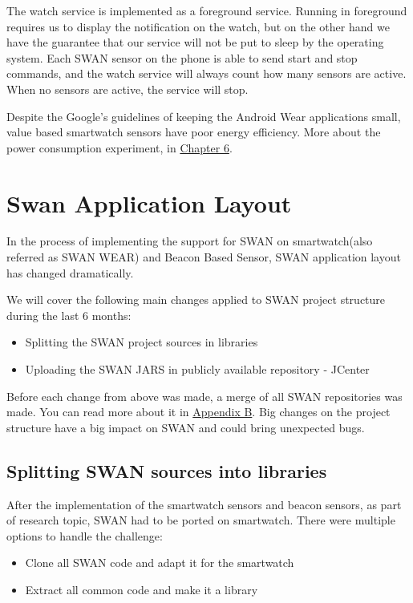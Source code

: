 The watch service is implemented as a foreground service\cite{foreground_service}. Running in foreground requires us to display the notification on the watch, but on the other hand we have the 
guarantee that our service will not be put to sleep by the operating system. 
Each SWAN sensor on the phone  is able to send start and stop commands, and the watch service will always count how many sensors are active. When no sensors are active, the service will stop.

Despite the Google's guidelines of keeping the Android Wear applications small, value based smartwatch sensors have poor energy efficiency. More about the power consumption experiment, 
in \hyperref[Chapter6]{Chapter 6}.

\section{Swan Application Layout}
In the process of implementing the support for SWAN on smartwatch(also referred as SWAN WEAR) and Beacon Based Sensor, SWAN application layout has changed dramatically.

We will cover the following main changes applied to SWAN project structure during the last 6 months:
\begin{itemize}
 \item Splitting the SWAN project sources in libraries
 \item Uploading the SWAN JARS in publicly available repository - JCenter
\end{itemize}

Before each change  from above was made,  a merge of all SWAN repositories was made. You can read more about it in \hyperref[AppendixB]{Appendix B}.
Big changes on the project structure have a big impact on SWAN and could bring unexpected bugs.


\subsection{Splitting SWAN sources into libraries}\label{scc:swan_split}
After the implementation of the smartwatch sensors and beacon sensors, as part of research topic, SWAN had to be ported on smartwatch.
There were multiple options to handle the challenge:
\begin{itemize}
 \item Clone all SWAN code and adapt it for the smartwatch
 \item Extract all common code and make it a library
\end{itemize}

